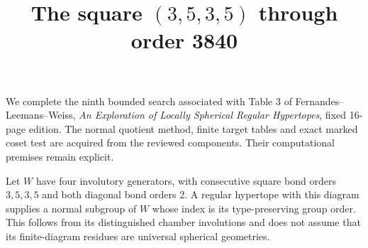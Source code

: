 \documentclass[11pt]{article}
\title{The square $(3,5,3,5)$ through order 3840}
\author{}\date{}
\begin{document}
\maketitle
We complete the ninth bounded search associated with Table 3 of
Fernandes--Leemans--Weiss, \emph{An Exploration of Locally Spherical
Regular Hypertopes}, fixed 16-page edition. The normal quotient method,
finite target tables and exact marked coset test are acquired from the
reviewed components. Their computational premises remain explicit.

Let $W$ have four involutory generators, with consecutive square bond
orders $3,5,3,5$ and both diagonal bond orders 2. A regular hypertope
with this diagram supplies a normal subgroup of $W$ whose index is its
type-preserving group order. This follows from its distinguished chamber
involutions and does not assume that its finite-diagram residues are
universal spherical geometries.
\end{document}
